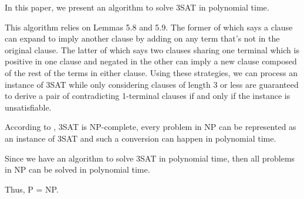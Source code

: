 \documentclass[manuscript]{acmart}
\begin{document}
    In this paper, we present an algorithm to solve 3SAT in polynomial time.

    This algorithm relies on Lemmas 5.8 and 5.9. The former of which says a clause
    can expand to imply another clause by adding on any term that's not in the original clause.
    The latter of which says two clauses sharing one terminal which is positive in one
    clause and negated in the other can imply a new clause composed of the rest of the terms
    in either clause. Using these strategies, we can process an instance of 3SAT 
    while only considering clauses of length 3 or less
    are guaranteed to derive a pair of contradicting 1-terminal clauses if and only if
    the instance is unsatisfiable.

    According to 
    \cite{Karp1972}, 3SAT is NP-complete, every problem in NP can be represented
    as an instance of 3SAT and such a conversion can happen in polynomial time.
    
    Since we have an algorithm to solve 3SAT in polynomial time, then all problems
    in NP can be solved in polynomial time.

    Thus, P = NP. 

    
    
\end{document}
